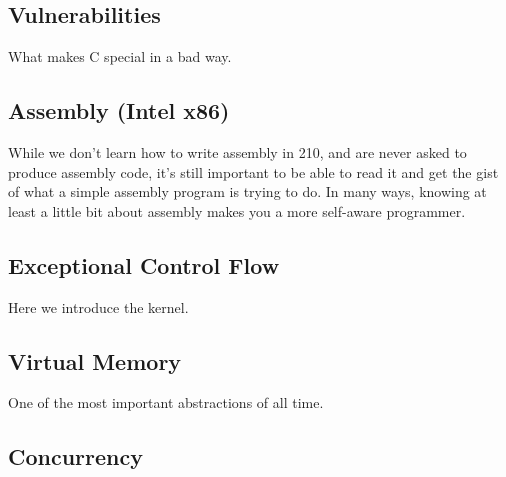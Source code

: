 \documentclass[fontsize=12pt,twoside=on,openright,parskip=half]{scrbook}
\begin{document}
\subsection*{Vulnerabilities}
What makes C special in a bad way.

\subsection*{Assembly (Intel x86)}
While we don’t learn how to write assembly in 210, and are never asked to
produce assembly code, it’s still important to be able to read it and get the
gist of what a simple assembly program is trying to do. In many ways, knowing
at least a little bit about assembly makes you a more self-aware programmer.

\subsection*{Exceptional Control Flow}
Here we introduce the kernel.

\subsection*{Virtual Memory}
One of the most important abstractions of all time.

\subsection*{Concurrency}
\end{document}
